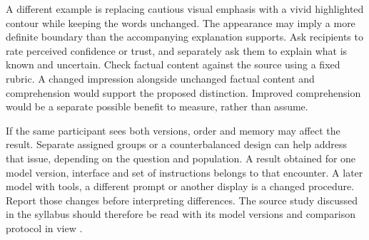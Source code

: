 A different example is replacing cautious visual emphasis with a vivid highlighted contour while keeping the words unchanged. The appearance may imply a more definite boundary than the accompanying explanation supports.
Ask recipients to rate perceived confidence or trust, and separately ask them to explain what is known and uncertain. Check factual content against the source using a fixed rubric. A changed impression alongside unchanged factual content and comprehension would support the proposed distinction. Improved comprehension would be a separate possible benefit to measure, rather than assume.

If the same participant sees both versions, order and memory may affect the result. Separate assigned groups or a counterbalanced design can help address that issue, depending on the question and population.
A result obtained for one model version, interface and set of instructions belongs to that encounter. A later model with tools, a different prompt or another display is a changed procedure. Report those changes before interpreting differences. The source study discussed in the syllabus should therefore be read with its model versions and comparison protocol in view \citep{zhang2026turing}.

